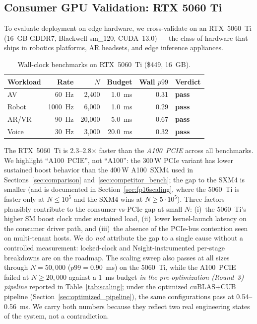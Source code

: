 \documentclass[11pt]{article}
\begin{document}
\subsection{Consumer GPU Validation: RTX 5060 Ti}
\label{sec:consumer_validation}

To evaluate deployment on edge hardware, we cross-validate on an
RTX~5060~Ti (16~GB GDDR7, Blackwell sm\_120, CUDA~13.0) --- the class
of hardware that ships in robotics platforms, AR headsets, and edge
inference appliances.

\begin{table}[ht]
\centering
\small
\caption{Wall-clock benchmarks on RTX~5060~Ti (\$449, 16~GB).}
\label{tab:consumer}
\begin{tabular}{lrrrrl}
\toprule
\textbf{Workload} & \textbf{Rate} & \textbf{$N$} & \textbf{Budget} & \textbf{Wall $p99$} & \textbf{Verdict} \\
\midrule
AV       &   60~Hz &  2{,}400 &  1.0~ms & 0.31 & \textbf{pass} \\
Robot    & 1000~Hz &  6{,}000 &  1.0~ms & 0.29 & \textbf{pass} \\
AR/VR    &   90~Hz & 20{,}000 &  5.0~ms & 0.67 & \textbf{pass} \\
Voice    &   30~Hz &  3{,}000 & 20.0~ms & 0.32 & \textbf{pass} \\
\bottomrule
\end{tabular}
\end{table}

The RTX~5060~Ti is 2.3--2.8$\times$ faster than the
\emph{A100~PCIE} across all benchmarks. We highlight ``A100~PCIE'',
not ``A100'': the 300\,W PCIe variant has lower sustained boost
behavior than the 400\,W A100~SXM4 used in
Sections~\ref{sec:comparison} and~\ref{sec:competitor_bench}; the
gap to the SXM4 is smaller (and is documented in
Section~\ref{sec:fp16scaling}, where the 5060~Ti is faster only at
$N \le 10^5$ and the SXM4 wins at $N \ge 5 \cdot 10^5$). Three
factors plausibly contribute to the consumer-vs-PCIe gap at small
$N$: (i)~the 5060~Ti's higher SM boost clock under sustained load,
(ii)~lower kernel-launch latency on the consumer driver path, and
(iii)~the absence of the PCIe-bus contention seen on multi-tenant
hosts. We do \emph{not} attribute the gap to a single cause without a
controlled measurement: locked-clock and Nsight-instrumented per-stage
breakdowns are on the roadmap. The scaling sweep also passes at all
sizes through $N{=}50{,}000$ ($p99 = 0.90$~ms) on the 5060~Ti, while
the A100~PCIE failed at $N \geq 20{,}000$ against a 1~ms budget
\emph{in the pre-optimization (Round~3) pipeline} reported in
Table~\ref{tab:scaling}; under the optimized cuBLAS+CUB pipeline
(Section~\ref{sec:optimized_pipeline}), the same configurations pass
at 0.54--0.56~ms. We carry both numbers because they reflect two
real engineering states of the system, not a contradiction.
\end{document}

